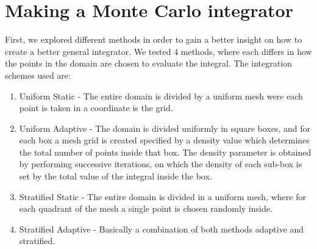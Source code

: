 \section{Making a Monte Carlo integrator}


First, we explored different methods
in order to gain a better insight on how to create a better general integrator. We tested 4 methods, where each differs in how
the points in the domain are chosen to evaluate the integral.
The integration schemes \cite{MCmethods} used are:
\begin{enumerate}
  \item Uniform Static - The entire domain is divided by a uniform mesh were each point is taken in a coordinate is the grid.
  \item Uniform Adaptive - The domain is divided uniformly in square boxes, and for each box a mesh grid is created
  specified by a density value which determines the total number of points inside that box. The density parameter
  is obtained by performing successive iterations, on which the density of each sub-box is set by the total value of the integral inside
  the box.
  \item Stratified Static - The entire domain is divided in a uniform mesh, where for each quadrant of the mesh
  a single point is chosen randomly inside.
  \item Stratified Adaptive - Basically a combination of both methods adaptive and stratified.
\end{enumerate}

